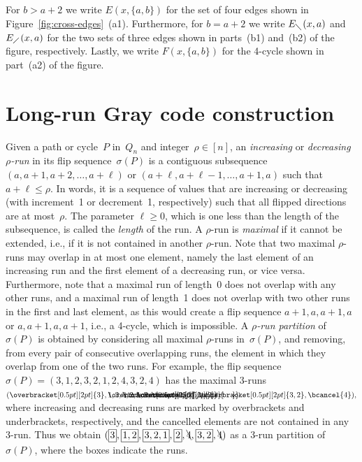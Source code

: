 \documentclass[11pt]{article}
\newcommand{\defi}[1]{\textcolor{defblue}{\emph{#1}}}
\newcommand*{\mybox}[1]{%
  \framebox{\raisebox{0pt}[0.45\baselineskip][0.05\baselineskip]{%
    $\!#1\!$}}}
\begin{document}
%
For $b>a+2$ we write $E(x,\{a,b\})$ for the set of four edges shown in Figure~\ref{fig:cross-edges}~(a1).
Furthermore, for $b=a+2$ we write $E_{\diagdown}(x,a)$ and~$E_{\diagup}(x,a)$ for the two sets of three edges shown in parts~(b1) and~(b2) of the figure, respectively.
Lastly, we write $F(x,\{a,b\})$ for the 4-cycle shown in part~(a2) of the figure.
%
%
\section{Long-run Gray code construction}
\label{sec:run}
%
Given a path or cycle~$P$ in~$Q_n$ and integer~$\rho\in[n]$, an \defi{increasing} or \defi{decreasing $\rho$-run} in its flip sequence~$\sigma(P)$ is a contiguous subsequence $(a,a+1,a+2,\ldots,a+\ell)$ or $(a+\ell,a+\ell-1,\ldots,a+1,a)$ such that $a+\ell\leq \rho$.
In words, it is a sequence of values that are increasing or decreasing (with increment~1 or decrement~1, respectively) such that all flipped directions are at most~$\rho$.
The parameter $\ell\geq 0$, which is one less than the length of the subsequence, is called the \defi{length} of the run.
%
A $\rho$-run is \defi{maximal} if it cannot be extended, i.e., if it is not contained in another $\rho$-run.
Note that two maximal $\rho$-runs may overlap in at most one element, namely the last element of an increasing run and the first element of a decreasing run, or vice versa.
Furthermore, note that a maximal run of length~0 does not overlap with any other runs, and a maximal run of length~1 does not overlap with two other runs in the first and last element, as this would create a flip sequence $a+1,a,a+1,a$ or $a,a+1,a,a+1$, i.e., a 4-cycle, which is impossible.
A \defi{$\rho$-run partition} of~$\sigma(P)$ is obtained by considering all maximal $\rho$-runs in~$\sigma(P)$, and removing, from every pair of consecutive overlapping runs, the element in which they overlap from one of the two runs.
For example, the flip sequence $\sigma(P)=(3,1,2,3,2,1,2,4,3,2,4)$ has the maximal 3-runs
$
(\overbracket[0.5pt][2pt]{3},\lefteqn{\overbracket[0.5pt][2pt]{\phantom{1,2,3}}}1,2,\lefteqn{\underbracket[0.5pt][2pt]{\phantom{3,2,1}}}3,2,\lefteqn{\overbracket[0.5pt][2pt]{\phantom{1,2}}}1,2,\bcancel{4},\underbracket[0.5pt][2pt]{3,2},\bcancel{4}),
$
where increasing and decreasing runs are marked by overbrackets and underbrackets, respectively, and the cancelled elements are not contained in any 3-run.
Thus we obtain $(\mybox{3},\mybox{1,2},\mybox{3,2,1},\mybox{2},\bcancel{4},\mybox{3,2},\bcancel{4})$ as a 3-run partition of~$\sigma(P)$, where the boxes indicate the runs.
\end{document}
